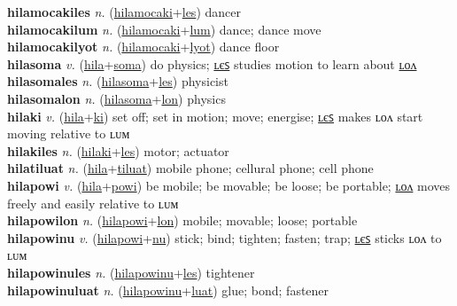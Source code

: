 \textbf{hilamocakiles} \textit{n.} (\hyperref[hilamocaki]{hilamocaki}+\hyperref[les]{les})
dancer \label{hilamocakiles} \\
\textbf{hilamocakilum} \textit{n.} (\hyperref[hilamocaki]{hilamocaki}+\hyperref[lum]{lum})
dance; dance move \label{hilamocakilum} \\
\textbf{hilamocakilyot} \textit{n.} (\hyperref[hilamocaki]{hilamocaki}+\hyperref[lyot]{lyot})
dance floor \label{hilamocakilyot} \\
\textbf{hilasoma} \textit{v.} (\hyperref[hila]{hila}+\hyperref[soma]{soma})
do physics; \hyperref[hilasomales]{ʟєꜱ} studies motion to learn about \hyperref[hilasomalon]{ʟᴏᴧ} \label{hilasoma} \\
\textbf{hilasomales} \textit{n.} (\hyperref[hilasoma]{hilasoma}+\hyperref[les]{les})
physicist \label{hilasomales} \\
\textbf{hilasomalon} \textit{n.} (\hyperref[hilasoma]{hilasoma}+\hyperref[lon]{lon})
physics \label{hilasomalon} \\
\textbf{hilaki} \textit{v.} (\hyperref[hila]{hila}+\hyperref[ki]{ki})
set off; set in motion; move; energise; \hyperref[hilakiles]{ʟєꜱ} makes ʟᴏᴧ start moving relative to ʟᴜᴍ \label{hilaki} \\
\textbf{hilakiles} \textit{n.} (\hyperref[hilaki]{hilaki}+\hyperref[les]{les})
motor; actuator \label{hilakiles} \\
\textbf{hilatiluat} \textit{n.} (\hyperref[hila]{hila}+\hyperref[tiluat]{tiluat})
mobile phone; cellural phone; cell phone \label{hilatiluat} \\
\textbf{hilapowi} \textit{v.} (\hyperref[hila]{hila}+\hyperref[powi]{powi})
be mobile; be movable; be loose; be portable; \hyperref[hilapowilon]{ʟᴏᴧ} moves freely and easily relative to ʟᴜᴍ \label{hilapowi} \\
\textbf{hilapowilon} \textit{n.} (\hyperref[hilapowi]{hilapowi}+\hyperref[lon]{lon})
mobile; movable; loose; portable \label{hilapowilon} \\
\textbf{hilapowinu} \textit{v.} (\hyperref[hilapowi]{hilapowi}+\hyperref[nu]{nu})
stick; bind; tighten; fasten; trap; \hyperref[hilapowinules]{ʟєꜱ} sticks ʟᴏᴧ to ʟᴜᴍ \label{hilapowinu} \\
\textbf{hilapowinules} \textit{n.} (\hyperref[hilapowinu]{hilapowinu}+\hyperref[les]{les})
tightener \label{hilapowinules} \\
\textbf{hilapowinuluat} \textit{n.} (\hyperref[hilapowinu]{hilapowinu}+\hyperref[luat]{luat})
glue; bond; fastener \label{hilapowinuluat} \\
